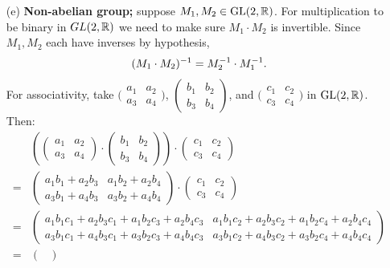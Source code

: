 \documentclass[../UNABRIDGEDalgebraNotesMSRI-UP2016.tex]{subfiles}
\begin{document}
\begin{frame}
\begin{itemize}
\item[(e)] \textbf{Non-abelian group;} suppose $M_1,M_2\in\operatorname{GL}(2,\mathbb R)$.  For multiplication to be binary in $GL(2,\mathbb R)$ we need to make sure $M_1\cdot M_2$ is invertible.  Since $M_1,M_2$ each have inverses by hypothesis,
\[
(M_1\cdot M_2)^{-1}=M_2^{-1}\cdot M_1^{-1}.
\]
For associativity, take $\Big(\begin{smallmatrix} a_1 & a_2 \\[2.5pt] a_3 & a_4 \end{smallmatrix}\Big)$, $\left(\begin{smallmatrix} b_1 & b_2 \\ b_3 & b_4 \end{smallmatrix}\right)$, and $\Big(\begin{smallmatrix} c_1 & c_2 \\[2.5pt] c_3 & c_4 \end{smallmatrix}\Big)$ in $\operatorname{GL}(2,\mathbb R)$.  Then:
\begin{align*}
	&\left(\begin{pmatrix}
	a_1 & a_2 \\
	a_3 & a_4 
	\end{pmatrix}\cdot
	\begin{pmatrix}
	b_1 & b_2 \\
	b_3 & b_4 
	\end{pmatrix}
	\right)\cdot
	\begin{pmatrix}
	c_1 & c_2 \\
	c_3 & c_4
	\end{pmatrix} \\
=& \begin{pmatrix}
	a_1b_1 + a_2b_3 & a_1b_2 + a_2b_4 \\
	a_3b_1 + a_4b_3 & a_3b_2 + a_4b_4
	\end{pmatrix}\cdot 
	\begin{pmatrix}
	c_1 & c_2 \\
	c_3 & c_4
	\end{pmatrix} \\
=& \begin{pmatrix}
a_1b_1c_1 + a_2b_3c_1 + a_1b_2c_3 + a_2b_4c_3 & 
	a_1b_1c_2 + a_2b_3c_2 +a_1b_2c_4 + a_2b_4c_4 \\
a_3b_1c_1 + a_4b_3c_1 + a_3b_2c_3 + a_4b_4c_3 & 
	a_3b_1c_2 + a_4b_3c_2 +a_3b_2c_4 + a_4b_4c_4	
\end{pmatrix} \\
=& \begin{pmatrix}

\end{pmatrix}
\end{align*}
\end{itemize}
\end{frame}
\end{document}
